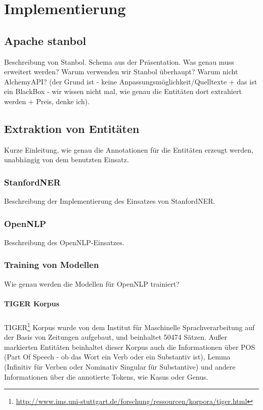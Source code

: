 \chapter{Implementierung}
\label{sec:Implementierung}

\section{Apache stanbol}
Beschreibung von Stanbol. Schema aus der Präsentation. Was genau muss erweitert werden? Warum verwenden wir Stanbol überhaupt? Warum nicht AlchemyAPI? (der Grund ist - keine Anpassungsmöglichkeit/Quelltexte + das ist ein BlackBox - wir wissen nicht mal, wie genau die Entitäten dort extrahiert werden + Preis, denke ich).

\section{Extraktion von Entitäten}
Kurze Einleitung, wie genau die Annotationen für die Entitäten erzeugt werden, unabhängig von dem benutzten Einsatz.

\subsection{StanfordNER} 
Beschreibung der Implementierung des Einsatzes von StanfordNER. 

\subsection{OpenNLP}
Beschreibung des OpenNLP-Einsatzes.

\subsection{Training von Modellen}
Wie genau werden die Modellen für OpenNLP trainiert?

\subsubsection{TIGER Korpus}
\paragraph{}
TIGER\footnote{\url{http://www.ims.uni-stuttgart.de/forschung/ressourcen/korpora/tiger.html}} Korpus wurde von dem Institut für Maschinelle Sprachverarbeitung auf der Basis von Zeitungen aufgebaut, und beinhaltet 50474 Sätzen. Außer markierten Entitäten beinhaltet dieser Korpus auch die Informationen über POS (Part Of Speech - ob das Wort ein Verb oder ein Substantiv ist), Lemma (Infinitiv für Verben oder Nominativ Singular für Substantive) und andere Informationen über die annotierte Tokens, wie Kasus oder Genus.

